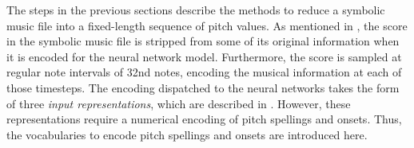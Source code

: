 
The steps in the previous sections describe the methods to
reduce a symbolic music file into a fixed-length sequence of
pitch values. As mentioned in
, the score in the symbolic
music file is stripped from some of its original information
when it is encoded for the neural network model.
Furthermore, the score is sampled at regular note intervals
of \gls{32nd} notes, encoding the musical information at
each of those timesteps. The encoding dispatched to the
neural networks takes the form of three \emph{input
representations}, which are described in
. However, these
representations require a numerical encoding of pitch
spellings and onsets. Thus, the vocabularies to encode pitch
spellings and onsets are introduced here.
